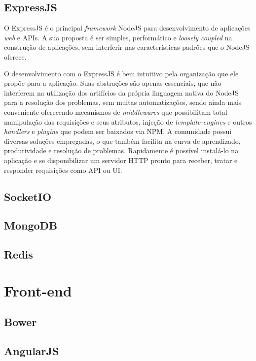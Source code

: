 \subsection{ExpressJS}
O ExpressJS \cite{expressjs} é o principal \textit{framework} NodeJS para desenvolvimento de aplicações \textit{web} e APIs. A sua proposta é ser simples, performático e \textit{loosely coupled} na construção de aplicações, sem interferir nas características padrões que o NodeJS oferece.

O desenvolvimento com o ExpressJS é bem intuitivo pela organização que ele propõe para a aplicação. Suas abstrações são apenas essenciais, que não interferem na utilização dos artifícios da própria linguagem nativa do NodeJS para a resolução dos problemas, sem muitas automatizações, sendo ainda mais conveniente oferecendo mecanismos de \textit{middlewares} que possibilitam total manipulação das requisições e seus atributos, injeção de \textit{template-engines} e outros \textit{handlers} e \textit{plugins} que podem ser baixados via NPM. A comunidade possui diversas soluções empregadas, o que também facilita na curva de aprendizado, produtividade e resolução de problemas. Rapidamente é possível instalá-lo na aplicação e se disponibilizar um servidor HTTP pronto para receber, tratar e responder requisições como API ou UI.

\subsection{SocketIO}


\subsection{MongoDB}


\subsection{Redis}


\section{Front-end}

\subsection{Bower}


\subsection{AngularJS}


